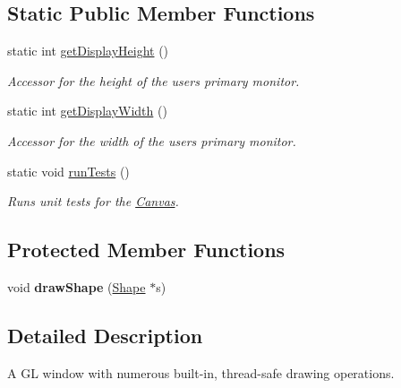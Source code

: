 \subsection*{Static Public Member Functions}
\begin{DoxyCompactItemize}
\item 
static int \hyperlink{classtsgl_1_1_canvas_a664b101f972845eaf5fdc4d9e664e623}{get\+Display\+Height} ()
\begin{DoxyCompactList}\small\item\em Accessor for the height of the user\textquotesingle{}s primary monitor. \end{DoxyCompactList}\item 
static int \hyperlink{classtsgl_1_1_canvas_abbe5c392cac2320fecf1f2751afb207c}{get\+Display\+Width} ()
\begin{DoxyCompactList}\small\item\em Accessor for the width of the user\textquotesingle{}s primary monitor. \end{DoxyCompactList}\item 
\hypertarget{classtsgl_1_1_canvas_a3365d92635f650cca2eda69812bef60b}{}static void \hyperlink{classtsgl_1_1_canvas_a3365d92635f650cca2eda69812bef60b}{run\+Tests} ()\label{classtsgl_1_1_canvas_a3365d92635f650cca2eda69812bef60b}

\begin{DoxyCompactList}\small\item\em Runs unit tests for the \hyperlink{classtsgl_1_1_canvas}{Canvas}. \end{DoxyCompactList}\end{DoxyCompactItemize}
\subsection*{Protected Member Functions}
\begin{DoxyCompactItemize}
\item 
\hypertarget{classtsgl_1_1_canvas_a560e3f64f3b2e5a7af8a8d7b92d8e660}{}void {\bfseries draw\+Shape} (\hyperlink{classtsgl_1_1_shape}{Shape} $\ast$s)\label{classtsgl_1_1_canvas_a560e3f64f3b2e5a7af8a8d7b92d8e660}

\end{DoxyCompactItemize}


\subsection{Detailed Description}
A G\+L window with numerous built-\/in, thread-\/safe drawing operations. 

